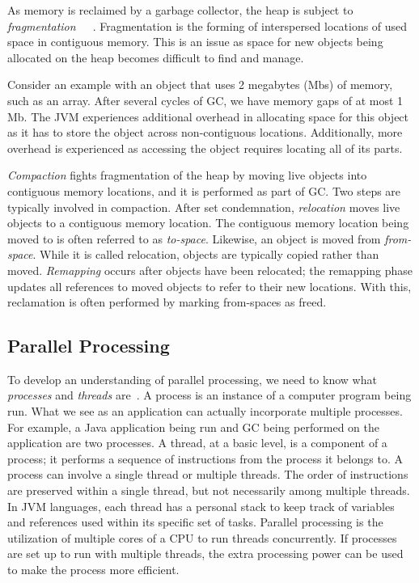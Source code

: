 \documentclass{sig-alternate}
\begin{document}
As memory is reclaimed by a garbage collector, the heap is subject to 
\emph{fragmentation}~\cite{Tene:C4}~\cite{Iyengar:Collie}~\cite{Osterlund:FPP}. Fragmentation is the forming
of interspersed locations of used space in contiguous memory. This
is an issue as space for new objects being allocated
on the heap becomes difficult to find and manage. 

Consider an example with an object that uses 2 megabytes (Mbs) of memory, 
such as an array. After several cycles of GC,
we have memory gaps of at most 1 Mb. 
The JVM experiences additional overhead in allocating space for this object
as it has to store the object across non-contiguous locations. Additionally,
more overhead is experienced as accessing the object requires locating
all of its parts.

\emph{Compaction} fights
fragmentation of the heap by moving live objects into contiguous memory locations, and
it is performed as part of GC. Two steps
are typically involved in compaction. After set condemnation, \emph{relocation} moves live objects
to a contiguous memory location.
The contiguous memory location being moved to is often referred to as \emph{to-space}.
Likewise, an object is moved from \emph{from-space}. While it is called 
relocation, objects are typically copied rather than moved. \emph{Remapping}
occurs after objects have been relocated; the remapping phase 
updates all references to moved objects to refer to their new locations. With this, 
reclamation is often performed by marking from-spaces as freed.


\subsection{Parallel Processing}
\label{sec:parallelProcessing}

To develop an understanding of parallel processing, we need to know 
what \emph{processes} and \emph{threads} are~\cite{oracle:threads}.
A process is an instance of a computer program being run. What we
see as an application can actually incorporate multiple processes.
For example, a Java application being run and GC being performed on the application are two processes.
A thread, at a basic level, is a component of a process; it performs a sequence
of instructions from the process it belongs to. 
A process can involve a single thread or multiple threads. The order 
of instructions are preserved within a single thread, but 
not necessarily among multiple threads. In JVM languages,
each thread has a personal stack to keep track of variables
and references used within its specific set of tasks. 
Parallel processing is the utilization of multiple
cores of a CPU to run threads concurrently. If processes are set up
to run with multiple threads, the extra processing power can be used to make 
the process more efficient.
\end{document}
